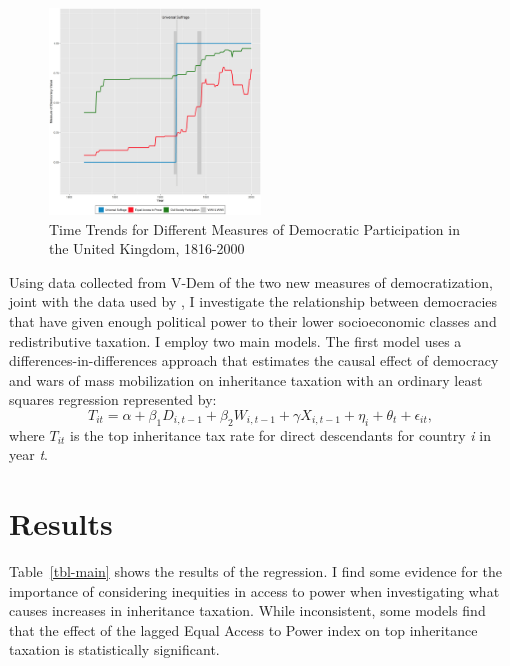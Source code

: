 \documentclass[12pt, ]{article}
\begin{document}
\begin{figure}[tbp]

{\centering \includegraphics[width=0.5\textwidth,height=\textheight]{figures/image7.png}

}

\caption{\label{fig-example}Time Trends for Different Measures of
Democratic Participation in the United Kingdom, 1816-2000}

\end{figure}

Using data collected from V-Dem of the two new measures of
democratization, joint with the data used by \citep{scheve2012}, I
investigate the relationship between democracies that have given enough
political power to their lower socioeconomic classes and redistributive
taxation. I employ two main models. The first model uses a
differences-in-differences approach that estimates the causal effect of
democracy and wars of mass mobilization on inheritance taxation with an
ordinary least squares regression represented by:
\[T_{it} = \alpha + \beta_{1}D_{i,t - 1} + \beta_{2}W_{i,t - 1} + \gamma X_{i,t - 1} + \eta_{i} + \theta_{t} + \epsilon_{it},\]
where \(T_{it}\) is the top inheritance tax rate for direct descendants
for country \emph{i} in year \emph{t}.

\hypertarget{results}{%
\section{Results}\label{results}}

Table~\ref{tbl-main} shows the results of the regression. I find some
evidence for the importance of considering inequities in access to power
when investigating what causes increases in inheritance taxation. While
inconsistent, some models find that the effect of the lagged Equal
Access to Power index on top inheritance taxation is statistically
significant.
\end{document}
